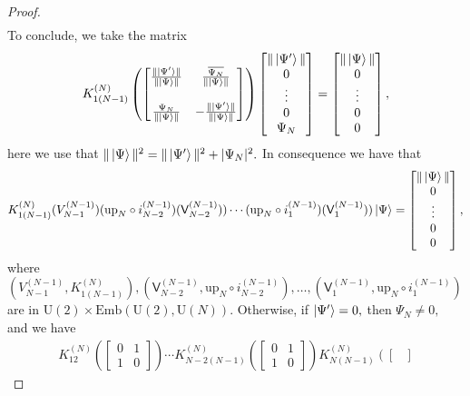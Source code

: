 \documentclass[10pt,a4paper]{amsart}
\newcommand{\rV}{\mathsf{V}}
\begin{document}
\begin{proof}
\begin{align*}
    \end{align*}
    To conclude, we take the matrix 
    $$
  K_{1(N-1)}^{(N)}\left(
    \begin{bmatrix}
      \frac{\|\ket{\Psi^{\prime}}\|}{\|\ket{\Psi}\|} & \frac{\overline{\Psi_N}}{\|\ket{\Psi}\|} \\
      & \\
      \frac{\Psi_N}{\|\ket{\Psi}\|} & - \frac{\|\ket{\Psi^{\prime}}\|}{\|\ket{\Psi}\|}
    \end{bmatrix}
  \right)\begin{bmatrix} \|\ket{\Psi^{\prime}}\| \\ 0 \\ \vdots  \\ 0 \\ \Psi_N \end{bmatrix} = \begin{bmatrix} \|\ket{\Psi}\| \\ 0 \\ \vdots  \\ 0 \\ 0 \end{bmatrix},
    $$
  here we use that $\|\ket{\Psi}\|^2 =\|\ket{\Psi^{\prime}}\|^2 + |\Psi_N|^2.$ In consequence we have that 
  $$
  K_{1(N-1)}^{(N)}(V_{N-1}^{(N-1)})(\mathrm{up}_N \circ i_{N-2}^{(N-1)})(\rV_{N-2}^{(N-1)})) \cdots  (\mathrm{up}_N \circ i_1^{(N-1)})(\rV_1^{(N-1)})) \ket{\Psi} = \begin{bmatrix} \|\ket{\Psi}\| \\ 0 \\ \vdots  \\ 0 \\ 0 \end{bmatrix},
  $$
  where 
  $
  (V_{N-1}^{(N-1)},K_{1(N-1)}^{(N)}),(\rV_{N-2}^{(N-1)},\mathrm{up}_N \circ i_{N-2}^{(N-1)}),\ldots,(\rV_1^{(N-1)},\mathrm{up}_N \circ i_1^{(N-1)})$ are in  $\mathrm{U}(2) \times\mathrm{Emb}(\mathrm{U}(2),\mathrm{U}(N)) .$ Otherwise, if $\ket{\Psi^{\prime}} = 0,$ then $\Psi_N \neq 0,$ and we have
  \begin{align*}
    K_{12}^{(N)}\left( \begin{bmatrix}
      0 & 1 \\
     1 & 0 \end{bmatrix}
     \right) \cdots K_{N-2(N-1)}^{(N)}\left( \begin{bmatrix}
      0 & 1 \\
     1 & 0 \end{bmatrix}
     \right) K_{N(N-1)}^{(N)}\left( \begin{bmatrix}

\end{bmatrix}
\end{align*}
\end{proof}
\end{document}

